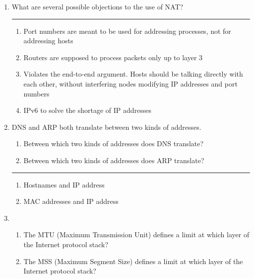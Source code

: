 \documentclass[twoside]{article}
\newenvironment{answer}
  {\vspace*{0.2cm} \rule{12cm}{0.04cm} \vspace*{0.2cm}}
  {\vspace*{0.2cm}}
\begin{document}
\begin{enumerate}
\begin{answer}
    \end{answer}

  \item What are several possible objections to the use of NAT?

  \begin{answer}

  \begin{enumerate}
    \item Port numbers are meant to be used for addressing processes, not for addressing hosts
    \item Routers are supposed to process packets only up to layer 3
    \item Violates the end-to-end argument. Hosts should be talking directly with each other, without interfering nodes modifying IP addresses and port numbers
    \item IPv6 to solve the shortage of IP addresses
    \end{enumerate}

    \end{answer}

  \item DNS and ARP both translate between two kinds of addresses.
  \begin{enumerate}
    \item Between which two kinds of addresses does DNS translate?
    \item Between which two kinds of addresses does ARP translate?
    \end{enumerate}

  \begin{answer}

  \begin{enumerate}
    \item Hostnames and IP address
    \item MAC addresses and IP address
    \end{enumerate}

    \end{answer}

  \item 
  \begin{enumerate}
    \item The MTU (Maximum Transmission Unit) defines a limit at which
      layer of the Internet protocol stack?
    \item The MSS (Maximum Segment Size) defines a limit at which
      layer of the Internet protocol stack?
    \end{enumerate}


\end{enumerate}
\end{document}

